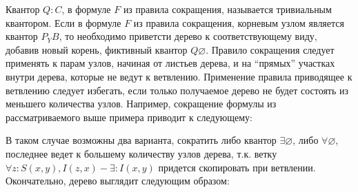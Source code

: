 \documentclass[a4paper,12pt]{article}
\begin{document}
Квантор $Q\colon C$, в формуле $F$ из правила сокращения, называется тривиальным квантором. Если в формуле $F$ из правила сокращения, корневым узлом является квантор $P_Y B$, то необходимо приветсти дерево к соответствующему виду, добавив новый корень, фиктивный квантор $Q\varnothing$. Правило сокращения следует применять к парам узлов, начиная от листьев дерева, и на ``прямых'' участках внутри дерева, которые не ведут к ветвлению. Применение правила приводящее к ветвлению следует избегать, если только получаемое дерево не будет состоять из меньшего количества узлов. Например, сокращение формулы из рассматриваемого выше примера приводит к следующему:
\begin{center}
\end{center}
В таком случае возможны два варианта, сократить либо квантор $\exists\varnothing$, либо $\forall\varnothing$, последнее ведет к большему количеству узлов дерева, т.к. ветку $\forall z\colon S(x,y),I(z,x) - \exists\colon I(x,y)$ придется скопировать при ветвлении. Окончательно, дерево выглядит следующим образом:

\begin{center}
\end{center}
\end{document}
